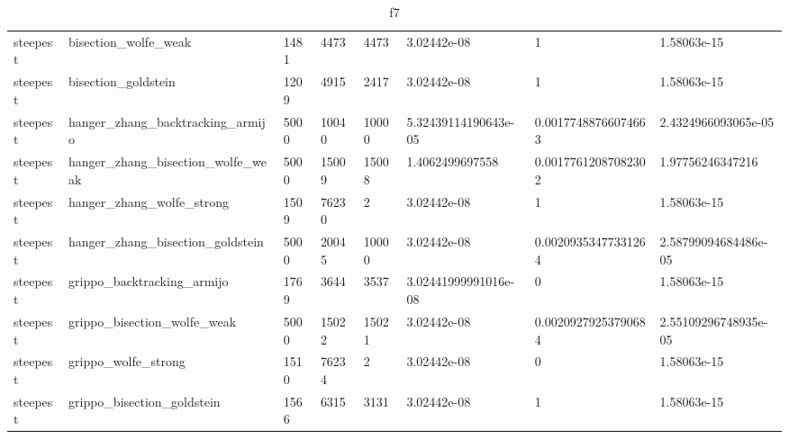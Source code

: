 \documentclass[a4paper,11pt]{article}
\numberwithin{equation}{section} %
\begin{document}
\begin{table}[h!]
{\begin{tabular}{|l|l|l|l|l|l|l|l|}
        steepest & bisection\_wolfe\_weak & 1481 & 4473 & 4473 & 3.02442e-08 & 1 & 1.58063e-15 \\
        steepest & bisection\_goldstein & 1209 & 4915 & 2417 & 3.02442e-08 & 1 & 1.58063e-15 \\
        steepest & hanger\_zhang\_backtracking\_armijo & 5000 & 10040 & 10000 & 5.32439114190643e-05 & 0.00177488766074663 & 2.4324966093065e-05 \\
        steepest & hanger\_zhang\_bisection\_wolfe\_weak & 5000 & 15009 & 15008 & 1.4062499697558 & 0.00177612087082302 & 1.97756246347216 \\
        steepest & hanger\_zhang\_wolfe\_strong & 1509 & 76230 & 2 & 3.02442e-08 & 1 & 1.58063e-15 \\
        steepest & hanger\_zhang\_bisection\_goldstein & 5000 & 20045 & 10000 & 3.02442e-08 & 0.00209353477331264 & 2.58799094684486e-05 \\
        steepest & grippo\_backtracking\_armijo & 1769 & 3644 & 3537 & 3.02441999991016e-08 & 0 & 1.58063e-15 \\
        steepest & grippo\_bisection\_wolfe\_weak & 5000 & 15022 & 15021 & 3.02442e-08 & 0.00209279253790684 & 2.55109296748935e-05 \\
        steepest & grippo\_wolfe\_strong & 1510 & 76234 & 2 & 3.02442e-08 & 0 & 1.58063e-15 \\
        steepest & grippo\_bisection\_goldstein & 1566 & 6315 & 3131 & 3.02442e-08 & 1 & 1.58063e-15 \\
\end{tabular}}
\caption{f7}
\label{table:f7}
\end{table}
\end{document}
